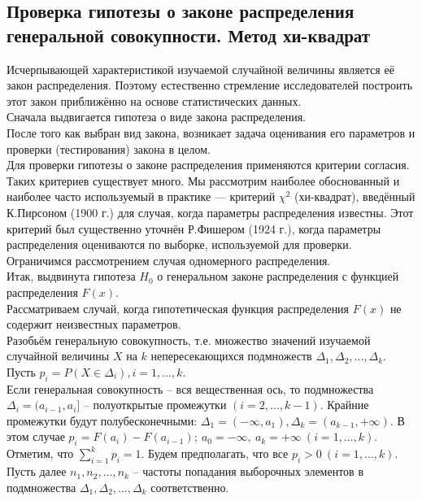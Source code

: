 \documentclass[main.tex]{subfiles}
\begin{document}
\subsection{Проверка гипотезы о законе распределения генеральной совокупности. Метод хи-квадрат}
Исчерпывающей характеристикой изучаемой случайной величины является её закон распределения. Поэтому естественно стремление исследователей построить этот закон приближённо на основе статистических данных. \\
Сначала выдвигается гипотеза о виде закона распределения. \\
После того как выбран вид закона, возникает задача оценивания его параметров и проверки (тестирования) закона в целом. \\
Для проверки гипотезы о законе распределения применяются критерии согласия. Таких критериев существует много. Мы рассмотрим наиболее обоснованный и наиболее часто используемый в практике — критерий $\chi^2$ (хи-квадрат), введённый К.Пирсоном (1900 г.) для случая, когда параметры распределения известны. Этот критерий был существенно уточнён Р.Фишером (1924 г.), когда параметры распределения оцениваются по выборке, используемой для проверки. \\
Ограничимся рассмотрением случая одномерного распределения. \\
Итак, выдвинута гипотеза $H_0$ о генеральном законе распределения с функцией распределения $F(x)$. \\
Рассматриваем случай, когда гипотетическая функция распределения $F(x)$ не содержит неизвестных параметров. \\
Разобьём генеральную совокупность, т.е. множество значений изучаемой случайной величины $X$ на $k$ непересекающихся подмножеств $\Delta_1, \Delta_2, \dots, \Delta_k$. \\
Пусть $p_i = P (X \in \Delta_i), i = 1, \dots, k$. \\
Если генеральная совокупность -- вся вещественная ось, то подмножества $\Delta_i = (a_{i-1}, a_i]$ -- полуоткрытые промежутки $(i = 2, \dots, k - 1)$. Крайние промежутки будут полубесконечными: $\Delta_1 = (-\infty, a_1), \Delta_k = (a_{k-1}, +\infty)$. В этом случае $p_i = F(a_i) - F(a_{i-1}); \ a_0 = -\infty, \ a_k = +\infty \ (i = 1, \dots, k)$. \\
Отметим, что $\sum_{i=1}^{k} p_i = 1$. Будем предполагать, что все $p_i > 0 \ (i = 1, \dots, k)$. \\
Пусть далее $n_1, n_2, \dots, n_k$ -- частоты  попадания выборочных элементов в подмножества $\Delta_1, \Delta_2, \dots, \Delta_k$ соответственно. \\
\end{document}
